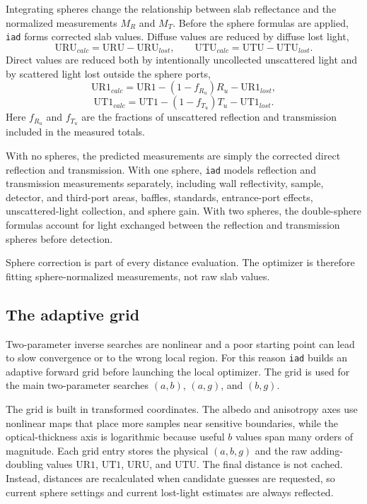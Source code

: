 \documentclass{article}
\newcommand\iadprog{\texttt{iad}}
\begin{document}
Integrating spheres change the relationship between slab reflectance and the
normalized measurements $M_R$ and $M_T$.  Before the sphere formulas are
applied, \iadprog{} forms corrected slab values.  Diffuse values are reduced by
diffuse lost light,
\[
  \mathrm{URU}_\mathit{calc}=\mathrm{URU}-\mathrm{URU}_\mathit{lost}, \qquad
  \mathrm{UTU}_\mathit{calc}=\mathrm{UTU}-\mathrm{UTU}_\mathit{lost}.
\]
Direct values are reduced both by intentionally uncollected unscattered light
and by scattered light lost outside the sphere ports,
\[
  \mathrm{UR1}_\mathit{calc}=\mathrm{UR1}-(1-f_{R_u})R_u-\mathrm{UR1}_\mathit{lost},
\]
\[
  \mathrm{UT1}_\mathit{calc}=\mathrm{UT1}-(1-f_{T_u})T_u-\mathrm{UT1}_\mathit{lost}.
\]
Here $f_{R_u}$ and $f_{T_u}$ are the fractions of unscattered reflection and
transmission included in the measured totals.

With no spheres, the predicted measurements are simply the corrected direct
reflection and transmission.  With one sphere, \iadprog{} models reflection
and transmission measurements separately, including wall reflectivity, sample,
detector, and third-port areas, baffles, standards, entrance-port effects,
unscattered-light collection, and sphere gain.  With two spheres, the
double-sphere formulas account for light exchanged between the reflection and
transmission spheres before detection.

Sphere correction is part of every distance evaluation.  The optimizer is
therefore fitting sphere-normalized measurements, not raw slab values.

\subsection{The adaptive grid}

Two-parameter inverse searches are nonlinear and a poor starting point can lead
to slow convergence or to the wrong local region.  For this reason \iadprog{}
builds an adaptive forward grid before launching the local optimizer.  The grid
is used for the main two-parameter searches $(a,b)$, $(a,g)$, and $(b,g)$.

The grid is built in transformed coordinates.  The albedo and anisotropy axes
use nonlinear maps that place more samples near sensitive boundaries, while the
optical-thickness axis is logarithmic because useful $b$ values span many
orders of magnitude.  Each grid entry stores the physical $(a,b,g)$ and the raw
adding-doubling values $\mathrm{UR1}$, $\mathrm{UT1}$, $\mathrm{URU}$, and
$\mathrm{UTU}$.
The final distance is not cached.  Instead, distances are recalculated when
candidate guesses are requested, so current sphere settings and current
lost-light estimates are always reflected.
\end{document}

